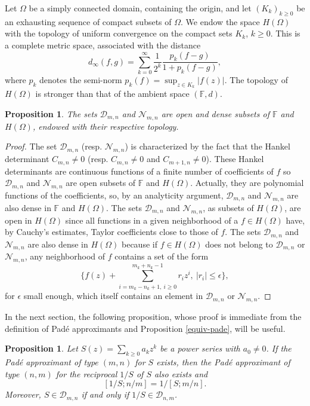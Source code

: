 \documentclass[12pt]{amsart}
\numberwithin{equation}{section}
\newtheorem{proposition}[theorem]{Proposition}
\begin{document}
Let $\Omega$ be a simply connected domain, containing the origin,
and let $(K_{k})_{k\geq 0}$ be an exhausting sequence of compact subsets of $\Omega$. We endow the space $H(\Omega)$ with the topology of uniform convergence on the compact sets $K_{k}$, $k\geq 0$. This is a complete metric space, associated with the distance
$$d_{\infty}(f,g)=\sum_{k=0}^{\infty}\frac{1}{2^{k}}\frac{p_{k}(f-g)}{1+p_{k}(f-g)},$$
where $p_{k}$ denotes the semi-norm $p_{k}(f)=\sup_{z\in K_{k}}|f(z)|$. The topology of $H(\Omega)$ is stronger than that of the ambient space $({\mathbb F},d)$. 
\begin{proposition}\label{D-N}
The sets ${\mathcal D}_{m,n}$ and ${\mathcal N}_{m,n}$ are open and dense subsets of ${\mathbb F}$ and $H(\Omega)$, endowed with their respective topology.
\end{proposition}
\begin{proof}
The set ${\mathcal D}_{m,n}$ (resp. ${\mathcal N}_{m,n}$) is characterized by the fact that the Hankel determinant $C_{m,n}\neq 0$ (resp. $C_{m,n}\neq0$ and $C_{m+1,n}\neq0$).
These Hankel determinants are continuous functions of a finite number of coefficients of $f$ so ${\mathcal D}_{m,n}$ and ${\mathcal N}_{m,n}$ are open subsets of ${\mathbb F}$ and $H(\Omega)$. Actually, they are polynomial functions of the coefficients, so, by an analyticity argument, ${\mathcal D}_{m,n}$ and ${\mathcal N}_{m,n}$ are also dense in ${\mathbb F}$ and $H(\Omega)$.
The sets ${\mathcal D}_{m,n}$ and ${\mathcal N}_{m,n}$, as subsets of $H(\Omega)$, are open in $H(\Omega)$ since all functions in a given neighborhood of a $f\in H(\Omega)$ have, by Cauchy's estimates, Taylor coefficients close to those of $f$. The sets ${\mathcal D}_{m,n}$ and ${\mathcal N}_{m,n}$ are also dense in $H(\Omega)$ because if 
$f\in H(\Omega)$ does not belong to ${\mathcal D}_{m,n}$ or ${\mathcal N}_{m,n}$, any neighborhood of $f$ contains a set of the form
$$\{f(z)+\sum_{i=m_{k}-n_{k}+1,~i\geq 0}^{m_{k}+n_{k}-1}r_{i}z^{i},~|r_{i}|\leq\epsilon\},$$
for $\epsilon$ small enough, which itself contains an element in ${\mathcal D}_{m,n}$ or ${\mathcal N}_{m,n}$.
\end{proof}
In the next section, the following proposition, whose proof is immediate from the definition of Pad\'e approximants and Proposition \ref{equiv-pade}, will be useful.
\begin{proposition}\label{inv-Pade}
Let $S(z)=\sum_{k\geq 0}a_{k}z^{k}$ be a power series with $a_{0}\neq 0$. If the Pad\'e approximant of type $(m,n)$ for $S$ exists, then the Pad\'e approximant of type $(n,m)$ for the reciprocal $1/S$ of $S$ also exists and 
$$[1/S;n/m]=1/[S;m/n].$$ 
Moreover, $S\in{\mathcal D}_{m,n}$ if and only if $1/S\in{\mathcal D}_{n,m}$.
\end{proposition}
\end{document}
